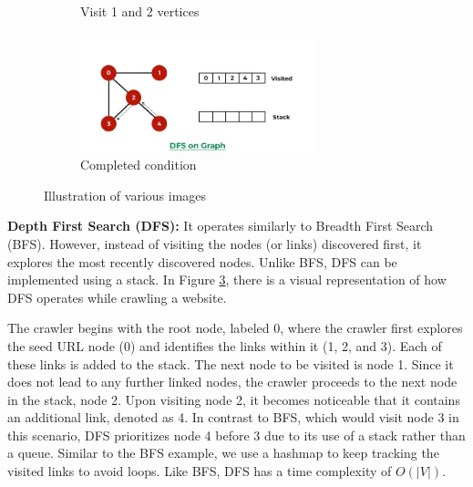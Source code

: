 \begin{figure}[ht]
\begin{subfigure}[b]{0.5\textwidth}
    \caption{Visit 1 and 2 vertices} 
    \label{fig7:c} 
  \end{subfigure}%
  \begin{subfigure}[b]{0.5\textwidth}
    \centering
    \includegraphics[width=0.75\textwidth]{images/dfs-4.png} 
    \caption{Completed condition} 
    \label{fig7:d} 
  \end{subfigure} 
  \caption{Illustration of various images}
  \label{fig:dfs} 
\end{figure}

\textbf{Depth First Search (DFS):} It operates similarly to Breadth First Search (BFS). However, instead of visiting the nodes (or links) discovered first, it explores the most recently discovered nodes. Unlike BFS, DFS can be implemented using a stack. In Figure \ref{fig:dfs}, there is a visual representation of how DFS operates while crawling a website.

The crawler begins with the root node, labeled 0, where the crawler first explores the seed URL node (0) and identifies the links within it (1, 2, and 3). Each of these links is added to the stack. The next node to be visited is node 1. Since it does not lead to any further linked nodes, the crawler proceeds to the next node in the stack, node 2. Upon visiting node 2, it becomes noticeable that it contains an additional link, denoted as 4. In contrast to BFS, which would visit node 3 in this scenario, DFS prioritizes node 4 before 3 due to its use of a stack rather than a queue. Similar to the BFS example, we use a hashmap to keep tracking the visited links to avoid loops. Like BFS, DFS has a time complexity of $O(|V|)$.

